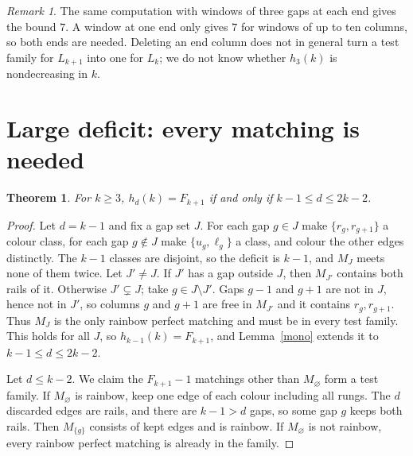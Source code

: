 \documentclass[11pt]{article}
\newtheorem{theorem}{Theorem}
\theoremstyle{remark}
\newtheorem*{remark}{Remark}
\begin{document}
\begin{remark}
The same computation with windows of three gaps at each end gives the bound
\(7\). A window at one end only gives \(7\) for windows of up to ten columns,
so both ends are needed. Deleting an end column does not in general turn a
test family for \(L_{k+1}\) into one for \(L_k\); we do not know whether
\(h_3(k)\) is nondecreasing in \(k\).
\end{remark}

\section{Large deficit: every matching is needed}
\begin{theorem}\label{sat}
For \(k\ge3\), \(h_d(k)=F_{k+1}\) if and only if \(k-1\le d\le 2k-2\).
\end{theorem}
\begin{proof}
Let \(d=k-1\) and fix a gap set \(J\). For each gap \(g\in J\) make
\(\{r_g,r_{g+1}\}\) a colour class, for each gap \(g\notin J\) make
\(\{u_g,\ell_g\}\) a class, and colour the other edges distinctly. The
\(k-1\) classes are disjoint, so the deficit is \(k-1\), and \(M_J\) meets
none of them twice. Let \(J'\ne J\). If \(J'\) has a gap outside \(J\), then
\(M_{J'}\) contains both rails of it. Otherwise \(J'\subsetneq J\); take
\(g\in J\setminus J'\). Gaps \(g-1\) and \(g+1\) are not in \(J\), hence not
in \(J'\), so columns \(g\) and \(g+1\) are free in \(M_{J'}\) and it
contains \(r_g,r_{g+1}\). Thus \(M_J\) is the only rainbow perfect matching
and must be in every test family. This holds for all \(J\), so
\(h_{k-1}(k)=F_{k+1}\), and Lemma~\ref{mono} extends it to
\(k-1\le d\le2k-2\).

Let \(d\le k-2\). We claim the \(F_{k+1}-1\) matchings other than
\(M_\varnothing\) form a test family. If \(M_\varnothing\) is rainbow, keep
one edge of each colour including all rungs. The \(d\) discarded edges are
rails, and there are \(k-1>d\) gaps, so some gap \(g\) keeps both rails.
Then \(M_{\{g\}}\) consists of kept edges and is rainbow. If \(M_\varnothing\) is not rainbow, every rainbow perfect matching is already in the family.
\end{proof}
\end{document}
